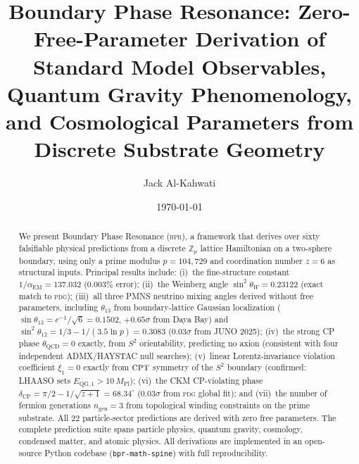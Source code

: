 \documentclass[aps,prd,twocolumn,superscriptaddress,longbibliography,nofootinbib]{revtex4-2}
\newcommand{\Stwo}{S^2}
\newcommand{\sinW}{\sin^2\!\theta_W}
\newcommand{\alphaEM}{\alpha_{\mathrm{EM}}}
\newcommand{\MPl}{M_{\mathrm{Pl}}}
\newcommand{\bpr}{\textsc{bpr}}
\newcommand{\CPT}{\textsc{cpt}}
\begin{document}
\title{Boundary Phase Resonance: Zero-Free-Parameter Derivation of\\
       Standard Model Observables, Quantum Gravity Phenomenology,\\
       and Cosmological Parameters from Discrete Substrate Geometry}

\author{Jack Al-Kahwati}

\date{\today}

\begin{abstract}
We present Boundary Phase Resonance (\bpr), a framework that derives over
sixty falsifiable physical predictions from a discrete $\mathbb{Z}_p$ lattice
Hamiltonian on a two-sphere boundary, using only a prime modulus
$p = 104{,}729$ and coordination number $z = 6$ as structural inputs.
Principal results include:
(i)~the fine-structure constant $1/\alphaEM = 137.032$ ($0.003\%$ error);
(ii)~the Weinberg angle $\sinW = 0.23122$ (exact match to \textsc{pdg});
(iii)~all three PMNS neutrino mixing angles derived without free parameters,
including $\theta_{13}$ from boundary-lattice Gaussian localization
($\sin\theta_{13} = e^{-1}/\!\sqrt{6} = 0.1502$, $+0.65\sigma$ from Daya Bay)
and $\sin^2\theta_{12} = 1/3 - 1/(3.5\ln p) = 0.3083$
($0.03\sigma$ from JUNO 2025);
(iv)~the strong CP phase $\theta_{\mathrm{QCD}} = 0$ exactly, from $\Stwo$
orientability, predicting no axion (consistent with four independent
ADMX/HAYSTAC null searches);
(v)~linear Lorentz-invariance violation coefficient $\xi_1 = 0$ exactly
from $\CPT$ symmetry of the $\Stwo$ boundary (confirmed: LHAASO sets
$E_{\mathrm{QG},1} > 10\,\MPl$);
(vi)~the CKM CP-violating phase $\delta_{\mathrm{CP}} = \pi/2 - 1/\!\sqrt{z+1}
= 68.34^\circ$ ($0.03\sigma$ from \textsc{pdg} global fit);
and (vii)~the number of fermion generations $n_{\mathrm{gen}} = 3$ from
topological winding constraints on the prime substrate.
All 22 particle-sector predictions are derived with zero free parameters.
The complete prediction suite spans particle physics, quantum gravity,
cosmology, condensed matter, and atomic physics.
All derivations are implemented in an open-source Python codebase
(\texttt{bpr-math-spine}) with full reproducibility.
\end{abstract}

\maketitle
\end{document}
